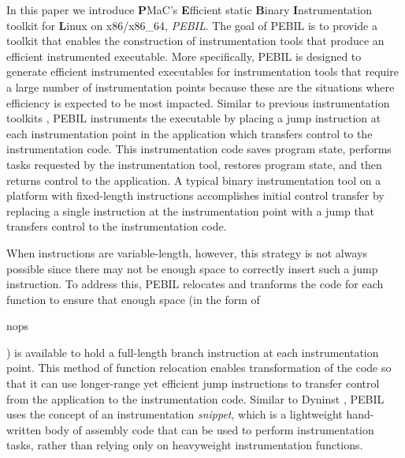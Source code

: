 In this paper we introduce \textbf{P}MaC's \textbf{E}fficient static
\textbf{B}inary \textbf{I}nstrumentation toolkit for \textbf{L}inux on
x86/x86\_64, \textit{PEBIL}. The goal of PEBIL is to provide a toolkit that
enables the construction of instrumentation tools that produce an efficient
instrumented executable. More specifically, PEBIL is designed to generate
efficient instrumented executables for instrumentation tools that require a
large number of instrumentation points because these are the situations where
efficiency is expected to be most impacted. Similar to previous instrumentation
toolkits \cite{buck2000api}, PEBIL instruments the executable by placing a jump
instruction at each instrumentation point in the application which transfers
control to the instrumentation code. This instrumentation code saves program
state, performs tasks requested by the instrumentation tool, restores program
state, and then returns control to the application. A typical binary
instrumentation tool on a platform with fixed-length instructions
\cite{tikir2006pmac} accomplishes initial control transfer by replacing a single
instruction at the instrumentation point with a jump that transfers control to
the instrumentation code. 

When instructions are variable-length, however, this strategy is not always
possible since there may not be enough space to correctly insert such a jump
instruction. To address this, PEBIL relocates and tranforms the code for each
function to ensure that enough space (in the form of \begin{it}nops\end{it}) is
available to hold a full-length branch instruction at each instrumentation
point. This method of function relocation enables transformation of the code so
that it can use longer-range yet efficient jump instructions to transfer control
from the application to the instrumentation code. Similar to Dyninst
\cite{buck2000api}, PEBIL uses the concept of an instrumentation
\textit{snippet}, which is a lightweight hand-written body of assembly code that
can be used to perform instrumentation tasks, rather than relying only on
heavyweight instrumentation functions.

